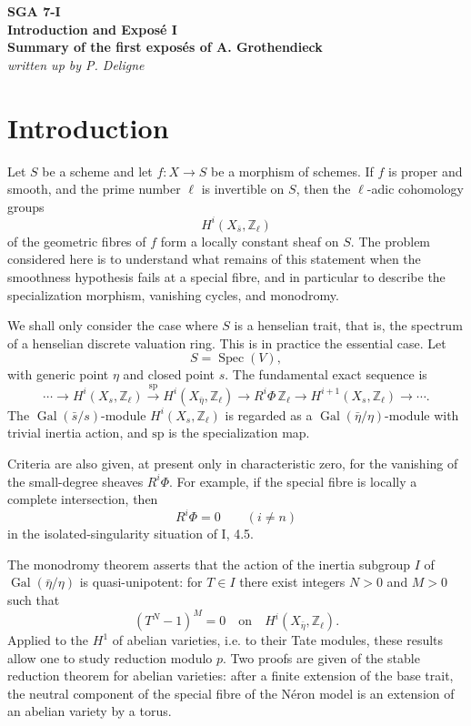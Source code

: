 \documentclass[12pt]{article}
\newcommand{\ZZ}{\mathbb Z}
\newcommand{\Spec}{\operatorname{Spec}}
\newcommand{\Gal}{\operatorname{Gal}}
\newcommand{\longto}{\longrightarrow}
\begin{document}
\begin{center}
{\Large\textbf{SGA 7-I}}\\[0.35em]
{\large\textbf{Introduction and Exposé I}}\\[0.2em]
{\large\textbf{Summary of the first exposés of A. Grothendieck}}\\[0.2em]
\textit{written up by P. Deligne}
\end{center}

\section*{Introduction}

Let $S$ be a scheme and let $f:X\to S$ be a morphism of schemes. If $f$ is proper and smooth, and the prime number $\ell$ is invertible on $S$, then the $\ell$-adic cohomology groups
\[
H^i(X_{\bar s},\ZZ_\ell)
\]
of the geometric fibres of $f$ form a locally constant sheaf on $S$. The problem considered here is to understand what remains of this statement when the smoothness hypothesis fails at a special fibre, and in particular to describe the specialization morphism, vanishing cycles, and monodromy.

We shall only consider the case where $S$ is a henselian trait, that is, the spectrum of a henselian discrete valuation ring. This is in practice the essential case. Let
\[
S=\Spec(V),
\]
with generic point $\eta$ and closed point $s$. The fundamental exact sequence is
\[
\cdots \longto H^i(X_s,\ZZ_\ell)
\xrightarrow{\mathrm{sp}}
H^i(X_{\bar\eta},\ZZ_\ell)
\longto R^i\Phi\,\ZZ_\ell
\longto H^{i+1}(X_s,\ZZ_\ell)
\longto\cdots .
\]
The $\Gal(\bar s/s)$-module $H^i(X_s,\ZZ_\ell)$ is regarded as a $\Gal(\bar\eta/\eta)$-module with trivial inertia action, and $\mathrm{sp}$ is the specialization map.

Criteria are also given, at present only in characteristic zero, for the vanishing of the small-degree sheaves $R^i\Phi$. For example, if the special fibre is locally a complete intersection, then
\[
R^i\Phi=0\qquad (i\neq n)
\]
in the isolated-singularity situation of I, 4.5.

The monodromy theorem asserts that the action of the inertia subgroup $I$ of $\Gal(\bar\eta/\eta)$ is quasi-unipotent: for $T\in I$ there exist integers $N>0$ and $M>0$ such that
\[
(T^N-1)^M=0
\quad\text{on}\quad
H^i(X_{\bar\eta},\ZZ_\ell).
\]
Applied to the $H^1$ of abelian varieties, i.e. to their Tate modules, these results allow one to study reduction modulo $p$. Two proofs are given of the stable reduction theorem for abelian varieties: after a finite extension of the base trait, the neutral component of the special fibre of the Néron model is an extension of an abelian variety by a torus.
\end{document}
